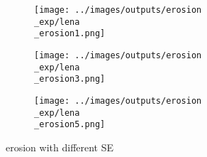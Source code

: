 \begin{subfigure}{0.9\textwidth}
   \centering
\begin{subfigure}[t]{0.22\textwidth}
    \texttt{[image: ../images/outputs/erosion\\\_exp/lena\\\_erosion1.png]}
    
    \centering
  \end{subfigure}
\begin{subfigure}[t]{0.22\textwidth}
    \texttt{[image: ../images/outputs/erosion\\\_exp/lena\\\_erosion3.png]}
    
    \centering
  \end{subfigure}
\begin{subfigure}[t]{0.22\textwidth}
    \texttt{[image: ../images/outputs/erosion\\\_exp/lena\\\_erosion5.png]}
    
    \centering
  \end{subfigure}
 \caption{erosion with different SE}
 \end{subfigure}
